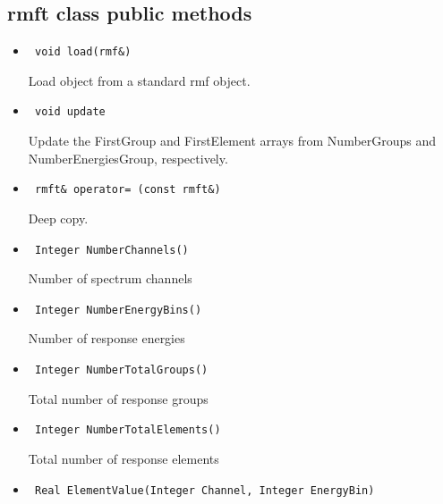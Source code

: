 \documentclass[11pt]{book}
\begin{document}
\subsection{rmft class public methods}

\begin{itemize}


\item  \begin{verbatim} void load(rmf&) \end{verbatim}

          Load object from a standard rmf object.

\item  \begin{verbatim} void update \end{verbatim}

          Update the FirstGroup and FirstElement arrays from 
          NumberGroups and NumberEnergiesGroup, respectively.

\item  \begin{verbatim} rmft& operator= (const rmft&) \end{verbatim}

          Deep copy.

\item  \begin{verbatim} Integer NumberChannels() \end{verbatim}

          Number of spectrum channels 

\item  \begin{verbatim} Integer NumberEnergyBins() \end{verbatim}

          Number of response energies 

\item  \begin{verbatim} Integer NumberTotalGroups() \end{verbatim}

          Total number of response groups 

\item  \begin{verbatim} Integer NumberTotalElements() \end{verbatim}

          Total number of response elements 

\item  \begin{verbatim} Real ElementValue(Integer Channel, Integer EnergyBin) \end{verbatim}


\end{itemize}
\end{document}
